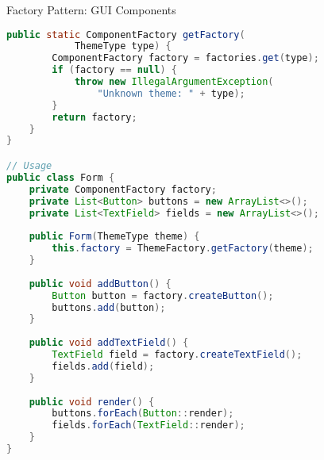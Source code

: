 \begin{example2}{Factory Pattern: GUI Components}
\begin{lstlisting}[language=Java, style=basesmol]
    public static ComponentFactory getFactory(
            ThemeType type) {
        ComponentFactory factory = factories.get(type);
        if (factory == null) {
            throw new IllegalArgumentException(
                "Unknown theme: " + type);
        }
        return factory;
    }
}

// Usage
public class Form {
    private ComponentFactory factory;
    private List<Button> buttons = new ArrayList<>();
    private List<TextField> fields = new ArrayList<>();
    
    public Form(ThemeType theme) {
        this.factory = ThemeFactory.getFactory(theme);
    }
    
    public void addButton() {
        Button button = factory.createButton();
        buttons.add(button);
    }
    
    public void addTextField() {
        TextField field = factory.createTextField();
        fields.add(field);
    }
    
    public void render() {
        buttons.forEach(Button::render);
        fields.forEach(TextField::render);
    }
}
\end{lstlisting}
\end{example2}

